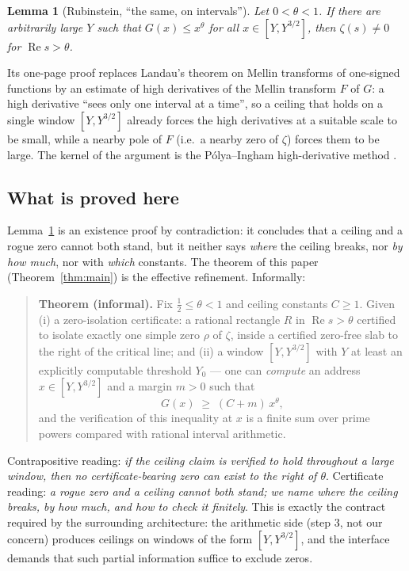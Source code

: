 \documentclass[11pt]{amsart}
\newtheorem{lemma}[theorem]{Lemma}
\numberwithin{equation}{section}
\newcommand{\re}{\operatorname{Re}}
\begin{document}
\begin{lemma}[Rubinstein, ``the same, on intervals'']\label{lem:rubinstein}
Let $0 < \theta < 1$. If there are arbitrarily large $Y$ such that
$G(x) \le x^{\theta}$ for all $x \in [Y, Y^{3/2}]$, then
$\zeta(s) \ne 0$ for $\re s > \theta$.
\end{lemma}

Its one-page proof replaces Landau's theorem on Mellin transforms of
one-signed functions \cite{Lan05, MV07} by an estimate of high derivatives
of the Mellin transform $F$ of $G$: a high derivative ``sees only one
interval at a time'', so a ceiling that holds on a single window $[Y,
Y^{3/2}]$ already forces the high derivatives at a suitable scale to be
small, while a nearby pole of $F$ (i.e.\ a nearby zero of $\zeta$) forces
them to be large. The kernel of the argument is the P\'olya--Ingham
high-derivative method \cite{Ing32}.

\subsection{What is proved here}

Lemma~\ref{lem:rubinstein} is an existence proof by contradiction: it
concludes that a ceiling and a rogue zero cannot both stand, but it
neither says \emph{where} the ceiling breaks, nor \emph{by how much}, nor
with \emph{which} constants. The theorem of this paper (Theorem~\ref{thm:main})
is the effective refinement. Informally:

\begin{quote}
\textbf{Theorem (informal).} Fix $\tfrac12 \le \theta < 1$ and ceiling
constants $C \ge 1$. Given (i) a zero-isolation certificate: a rational
rectangle $R$ in $\re s > \theta$ certified to isolate exactly one simple
zero $\rho$ of $\zeta$, inside a certified zero-free slab to the right of
the critical line; and (ii) a window $[Y, Y^{3/2}]$ with $Y$ at least an
explicitly computable threshold $Y_0$ --- one can \emph{compute} an address
$x \in [Y, Y^{3/2}]$ and a margin $m > 0$ such that
\[
G(x) \;\ge\; (C + m)\, x^{\theta},
\]
and the verification of this inequality at $x$ is a finite sum over prime
powers compared with rational interval arithmetic.
\end{quote}

Contrapositive reading: \emph{if the ceiling claim is verified to hold
throughout a large window, then no certificate-bearing zero can exist to
the right of $\theta$}. Certificate reading: \emph{a rogue zero and a
ceiling cannot both stand; we name where the ceiling breaks, by how much,
and how to check it finitely}. This is exactly the contract required by the
surrounding architecture: the arithmetic side (step 3, not our concern)
produces ceilings on windows of the form $[Y, Y^{3/2}]$, and the interface
demands that such partial information suffice to exclude zeros.
\end{document}
